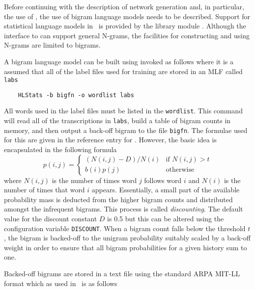 
Before continuing with the description of network generation
and, in particular, the use of , the 
use of bigram language models needs to be described.
Support for statistical language models in \HTK\ is provided
by the library module .  Although the interface to
 can support general N-grams,  
the facilities for
constructing and using N-grams are limited to bigrams.

A bigram language model can be built using 
invoked as follows where it is a assumed that all of the
label files used for
training are stored in an MLF called \texttt{labs}
\begin{verbatim}
    HLStats -b bigfn -o wordlist labs
\end{verbatim}
All words used in the label files must be listed in the \texttt{wordlist}.
This command will read all of the transcriptions in \texttt{labs},
build a table of
bigram counts in memory, and then output a back-off bigram
to the file \texttt{bigfn}.  The formulae used for this are
given in the reference entry for .  However, the 
basic idea is encapsulated in the following formula
\[
   p(i,j) = \left\{
      \begin{array}{ll}
           (N(i,j) - D )/N(i) & \mbox{if $N(i,j) > t$} \\
                  b(i) p(j)  & \mbox{otherwise}
       \end{array}
   \right. 
\]
where $N(i,j)$ is the number of times word $j$ follows word $i$ and
$N(i)$ is the number of times that word $i$ appears.
Essentially, a small part of the available probability mass
is deducted from the higher bigram counts and distributed amongst
the infrequent bigrams.  This process is called \textit{discounting}.
The default value for the discount constant $D$ is 0.5 but 
this can be altered using the configuration variable 
\texttt{DISCOUNT}.
When a bigram count falls below the threshold
$t$, the bigram is backed-off to the unigram probability suitably scaled
by a back-off weight in order to ensure that all bigram probabilities for a given
history sum to one.

Backed-off bigrams are 
stored in a text file using the standard
ARPA MIT-LL format which as used in \HTK\ is as follows


